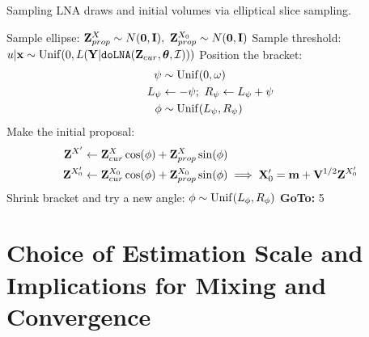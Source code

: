 \begin{algorithm}[htbp]
	\caption{Sampling LNA draws and initial volumes via elliptical slice sampling.}
	\label{alg:elliptss_lna_initvols}
	\begin{algorithmic}[1]
		\State Sample ellipse: $ \mathbf{Z}^X_{prop} \sim N(\boldsymbol{0}, \mathbf{I}),\ \mathbf{Z}^{X_0}_{prop} \sim N(\boldsymbol{0}, \mathbf{I})$
		\State Sample threshold: $ u|\mathbf{x} \sim \mathrm{Unif}(0, L(\mathbf{Y}|\texttt{doLNA}(\mathbf{Z}_{cur},\boldsymbol{\theta},\mathcal{I}))) $
		\State Position the bracket: \vspace{-0.1in}
		\begin{align*}
		\psi &\sim \mathrm{Unif}(0,\omega)\\
		L_\psi &\leftarrow -\psi;\ R_\psi \leftarrow L_\psi + \psi\\
		\phi &\sim \mathrm{Unif}(L_\psi,R_\psi)
		\end{align*}
		\State Make the initial proposal: \vspace{-0.1in}\begin{align*}
		 \mathbf{Z}^{X'} &\leftarrow \mathbf{Z}^X_{cur}\cos(\phi) + \mathbf{Z}^X_{prop}\sin(\phi) \\ \mathbf{Z}^{X_0'} &\leftarrow \mathbf{Z}^{X_0}_{cur}\cos(\phi) + \mathbf{Z}^{X_0}_{prop}\sin(\phi) \implies \mathbf{X}_0^\prime = \mathbf{m} + \mathbf{V}^{1/2}\mathbf{Z}^{X_0^\prime}
		\end{align*}
		\State{}
		\Else
		\State Shrink bracket and try a new angle:
		\State $ \phi \sim \mathrm{Unif}(L_\phi, R_\phi) $
		\State \textbf{GoTo:} 5
		\EndIf
		\EndProcedure
	\end{algorithmic}
\end{algorithm}

\section{Choice of Estimation Scale and Implications for Mixing and Convergence}
\label{sec:est_scale_discussion}

